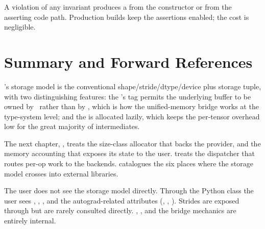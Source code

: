 A violation of any invariant produces a  from the
constructor or from the asserting code path. Production builds keep
the assertions enabled; the cost is negligible.

\section{Summary and Forward References}
\label{sec:tensor_model:summary}

\Lucid's storage model is the conventional shape/stride/dtype/device
plus storage tuple, with two distinguishing features: the
's  tag permits the underlying buffer
to be owned by \MLX\ rather than by \Lucid, which is how the
unified-memory bridge works at the type-system level; and the
 is allocated lazily, which keeps the per-tensor
overhead low for the great majority of intermediates.

The next chapter, , treats the size-class
allocator that backs the  provider, and the memory
accounting that exposes its state to the user. 
treats the dispatcher that routes per-op work to the backends.
 catalogues the six places where the
storage model crosses into external libraries.

\begin{lucidnote}
The user does not see the storage model directly. Through the
Python  class the user sees ,
, , and the autograd-related attributes
(, , ). Strides
are exposed through  but are rarely consulted
directly. , , and the bridge
mechanics are entirely internal.
\end{lucidnote}

